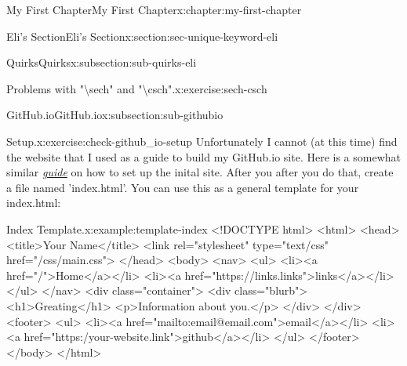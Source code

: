 \documentclass[oneside,10pt,]{book}
\numberwithin{equation}{section}
\begin{document}
\begin{chapterptx}{My First Chapter}{}{My First Chapter}{}{}{x:chapter:my-first-chapter}
\begin{sectionptx}{Eli's Section}{}{Eli's Section}{}{}{x:section:sec-unique-keyword-eli}
\begin{subsectionptx}{Quirks}{}{Quirks}{}{}{x:subsection:sub-quirks-eli}
\begin{inlineexercise}{Problems with "\textbackslash{}sech" and "\textbackslash{}csch".}{x:exercise:sech-csch}
\end{inlineexercise}
\end{subsectionptx}
%
%
\typeout{************************************************}
\typeout{************************************************}
%
\begin{subsectionptx}{GitHub.io}{}{GitHub.io}{}{}{x:subsection:sub-githubio}
\begin{inlineexercise}{Setup.}{x:exercise:check-github_io-setup}%
Unfortunately I cannot (at this time) find the website that I used as a guide to build my GitHub.io site. Here is a somewhat similar \href{https://medium.com/@svinkle/publish-and-share-your-own-website-for-free-with-github-2eff049a1cb5}{\emph{guide}} on how to set up the inital site. After you after you do that, create a file named 'index.html'. You can use this as a general template for your index.html: \begin{example}{Index Template.}{x:example:template-index}%
\textless{}!DOCTYPE html\textgreater{} \textless{}html\textgreater{} \textless{}head\textgreater{} \textless{}title\textgreater{}Your Name\textless{}\slash{}title\textgreater{}  \textless{}link rel="stylesheet" type="text\slash{}css" href="\slash{}css\slash{}main.css"\textgreater{} \textless{}\slash{}head\textgreater{} \textless{}body\textgreater{} \textless{}nav\textgreater{} \textless{}ul\textgreater{} \textless{}li\textgreater{}\textless{}a href="\slash{}"\textgreater{}Home\textless{}\slash{}a\textgreater{}\textless{}\slash{}li\textgreater{} \textless{}li\textgreater{}\textless{}a href="https:\slash{}\slash{}links.links"\textgreater{}links\textless{}\slash{}a\textgreater{}\textless{}\slash{}li\textgreater{} \textless{}\slash{}ul\textgreater{} \textless{}\slash{}nav\textgreater{} \textless{}div class="container"\textgreater{} \textless{}div class="blurb"\textgreater{} \textless{}h1\textgreater{}Greating\textless{}\slash{}h1\textgreater{} \textless{}p\textgreater{}Information about you.\textless{}\slash{}p\textgreater{} \textless{}\slash{}div\textgreater{} \textless{}\slash{}div\textgreater{} \textless{}footer\textgreater{} \textless{}ul\textgreater{} \textless{}li\textgreater{}\textless{}a href="mailto:email@email.com"\textgreater{}email\textless{}\slash{}a\textgreater{}\textless{}\slash{}li\textgreater{} \textless{}li\textgreater{}\textless{}a href="https:\slash{}your-website.link"\textgreater{}github\textless{}\slash{}a\textgreater{}\textless{}\slash{}li\textgreater{} \textless{}\slash{}ul\textgreater{} \textless{}\slash{}footer\textgreater{} \textless{}\slash{}body\textgreater{} \textless{}\slash{}html\textgreater{}%

\end{example}
\end{inlineexercise}
\end{subsectionptx}
\end{sectionptx}
\end{chapterptx}
\end{document}
